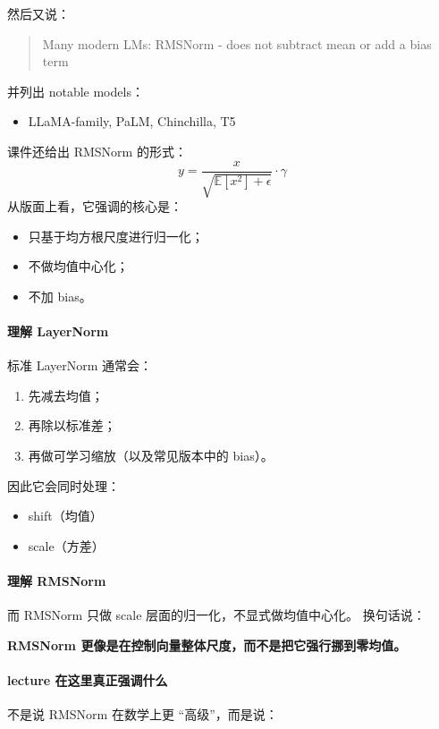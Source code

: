 \documentclass[a4paper,UTF8]{article}
\numberwithin{equation}{section}
\begin{document}
然后又说：

\begin{quote}
Many modern LMs: RMSNorm - does not subtract mean or add a bias term
\end{quote}

并列出 notable models：
\begin{itemize}
    \item LLaMA-family, PaLM, Chinchilla, T5
\end{itemize}

课件还给出 RMSNorm 的形式：
\[
y = \frac{x}{\sqrt{\mathbb{E}[x^2] + \epsilon}} \cdot \gamma
\]
从版面上看，它强调的核心是：
\begin{itemize}
    \item 只基于均方根尺度进行归一化；
    \item 不做均值中心化；
    \item 不加 bias。
\end{itemize}

\paragraph{理解 LayerNorm}
标准 LayerNorm 通常会：
\begin{enumerate}
    \item 先减去均值；
    \item 再除以标准差；
    \item 再做可学习缩放（以及常见版本中的 bias）。
\end{enumerate}

因此它会同时处理：
\begin{itemize}
    \item shift（均值）
    \item scale（方差）
\end{itemize}

\paragraph{理解 RMSNorm}
而 RMSNorm 只做 scale 层面的归一化，不显式做均值中心化。  
换句话说：

\begin{center}
\textbf{RMSNorm 更像是在控制向量整体尺度，而不是把它强行挪到零均值。}
\end{center}

\paragraph{lecture 在这里真正强调什么}
不是说 RMSNorm 在数学上更 ``高级''，而是说：
\end{document}
